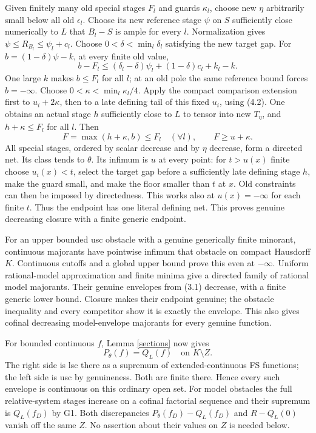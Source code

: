 \documentclass[10pt]{article}
\begin{document}
Given finitely many old special stages $F_l$ and guards $\kappa_l$, choose
new $\eta$ arbitrarily small below all old $\epsilon_l$. Choose its new
reference stage $\psi$ on $S$ sufficiently close numerically to $L$ that
$B_l-S$ is ample for every $l$. Normalization gives
$\psi\leq R_{B_l}\leq\psi_l+c_l$. Choose
$0<\delta<\min_l\delta_l$ satisfying the new target gap. For
$b=(1-\delta)\psi-k$, at every finite old value,
\[
 b-F_l\leq(\delta_l-\delta)\psi_l+(1-\delta)c_l+k_l-k.
\]
One large $k$ makes $b\leq F_l$ for all $l$; at an old pole the same
reference bound forces $b=-\infty$. Choose
$0<\kappa<\min_l\kappa_l/4$. Apply the compact comparison extension
first to $u_i+2\kappa$, then to a late defining tail of this fixed $u_i$,
using (4.2). One obtains an actual stage $h$ sufficiently close to $L$
to tensor into new $T_\eta$, and $h+\kappa\leq F_l$ for all $l$. Then
\[
 F=\max(h+\kappa,b)\leq F_l\quad(\forall l),\qquad F\geq u+\kappa.
\]
All special stages, ordered by scalar decrease and by $\eta$ decrease,
form a directed net. Its class tends to $\theta$. Its infimum is $u$
at every point: for $t>u(x)$ finite choose $u_i(x)<t$, select the target
gap before a sufficiently late defining stage $h$, make the guard small,
and make the floor smaller than $t$ at $x$. Old constraints can then be
imposed by directedness. This works also at $u(x)=-\infty$ for each finite
$t$. Thus the endpoint has one literal defining net. This proves genuine
decreasing closure with a finite generic endpoint.

For an upper bounded usc obstacle with a genuine generically finite
minorant, continuous majorants have pointwise infimum that obstacle on
compact Hausdorff $K$. Continuous cutoffs and a global upper bound prove
this even at $-\infty$. Uniform rational-model approximation and finite
minima give a directed family of rational model majorants. Their genuine
envelopes from (3.1) decrease, with a finite generic lower bound. Closure
makes their endpoint genuine; the obstacle inequality and every competitor
show it is exactly the envelope. This also gives cofinal decreasing
model-envelope majorants for every genuine function.

For bounded continuous $f$, Lemma \ref{sections} now gives
\[
 P_\theta(f)=Q_L(f)\quad\text{on }K\setminus Z.
\tag{4.3}
\]
The right side is lsc there as a supremum of extended-continuous FS
functions; the left side is usc by genuineness. Both are finite there.
Hence every such envelope is continuous on this ordinary open set.
For model obstacles the full relative-system stages increase on a
cofinal factorial sequence and their supremum is $Q_L(f_D)$ by G1.
Both discrepancies $P_\theta(f_D)-Q_L(f_D)$ and $R-Q_L(0)$ vanish off
the same $Z$. No assertion about their values on $Z$ is needed below.
\end{document}
